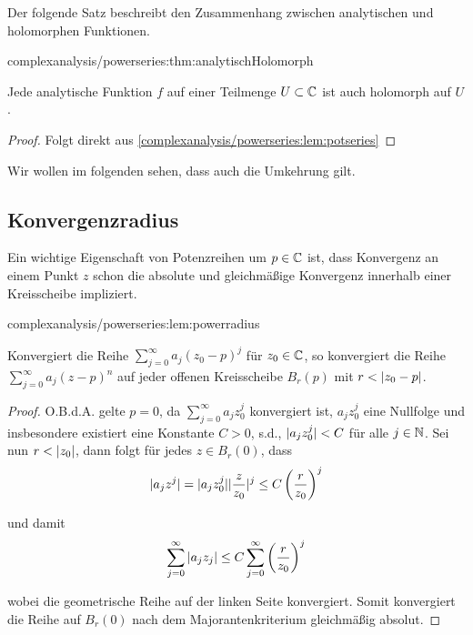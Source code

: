\par
Der folgende Satz beschreibt den Zusammenhang zwischen analytischen und holomorphen Funktionen.
\begin{theorem}{}{complexanalysis/powerseries:thm:analytischHolomorph}



\par
Jede analytische Funktion \(f\) auf einer Teilmenge \(U \subset \mathbb{C}\) ist auch holomorph auf \(U\).
\end{theorem}

\begin{proof}
 Folgt direkt aus \cref{complexanalysis/powerseries:lem:potseries} \end{proof}

\par
Wir wollen im folgenden sehen, dass auch die Umkehrung gilt.


\subsection{Konvergenzradius}
\label{\detokenize{complexanalysis/powerseries:konvergenzradius}}
\par
Ein wichtige Eigenschaft von Potenzreihen um \(p\in\mathbb{C}\) ist, dass Konvergenz an einem Punkt \(z\) schon die absolute und gleichmäßige Konvergenz innerhalb einer Kreisscheibe impliziert.
\begin{lemma}{}{complexanalysis/powerseries:lem:powerradius}



\par
Konvergiert die Reihe \(\sum_{j=0}^\infty a_j (z_0-p)^j\) für \(z_0\in\mathbb{C}\), so konvergiert die Reihe \(\sum_{j=0}^\infty a_j (z-p)^n\) auf jeder offenen Kreisscheibe \(B_r(p)\) mit \(r< \vert z_0 - p \vert\).
\end{lemma}

\begin{proof}
 O.B.d.A. gelte \(p=0\), da \(\sum_{j=0}^\infty a_j z_0^j\) konvergiert ist, \(a_j z_0^j\) eine Nullfolge und insbesondere existiert eine Konstante \(C>0\), s.d., \(\vert a_j z_0^j \vert< C\) für alle \(j\in\mathbb{N}\). Sei nun \(r<\vert z_0 \vert\), dann folgt für jedes \(z\in B_r(0)\), dass
\begin{align*}
\vert a_j z^j \vert = \vert a_j z_0^j \vert\vert \frac{z}{z_0} \vert^j\leq C \left(\frac{r}{z_0}\right)^j
\end{align*}
\par
und damit
\begin{align*}
\sum_{j=0}^\infty \vert a_j z_j \vert \leq C \sum_{j=0}^\infty \left(\frac{r}{z_0}\right)^j
\end{align*}
\par
wobei die geometrische Reihe auf der linken Seite konvergiert. Somit konvergiert die Reihe auf \(B_r(0)\) nach dem Majorantenkriterium gleichmäßig absolut.
\end{proof}

